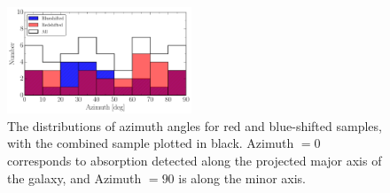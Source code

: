 \documentclass[iop]{emulateapj-rtx4}
\begin{document}
\begin{figure}[ht!]
        \centering
        \includegraphics[width=0.49\textwidth]{hist(azimuth)_overlaid_all.pdf}
        \caption{\small{The distributions of azimuth angles for red and blue-shifted samples, with the combined sample plotted in black. Azimuth $= 0$ corresponds to absorption detected along the projected major axis of the galaxy, and Azimuth $= 90$ is along the minor axis.}}
        \label{azimuth_dist}
        \vspace{5pt}
\end{figure}




%
% 
\end{document}
